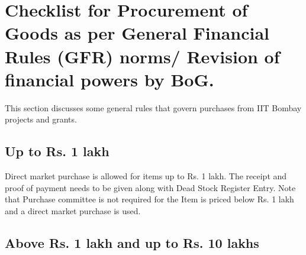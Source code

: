 \documentclass[
  10pt,
  a5paper,
  10pt,
  openany]{amsbook}
\begin{document}
\chapter{Checklist for Procurement of Goods as per General Financial
Rules (GFR) norms/ Revision of financial powers by
BoG.}\label{checklist-for-procurement-of-goods-as-per-general-financial-rules-gfr-norms-revision-of-financial-powers-by-bog.}

This section discusses some general rules that govern purchases from IIT
Bombay projects and grants.

\section{Up to Rs. 1 lakh}\label{up-to-rs.-1-lakh}

Direct market purchase is allowed for items up to Rs. 1 lakh. The
receipt and proof of payment needs to be given along with Dead Stock
Register Entry. Note that Purchase committee is not required for the
Item is priced below Rs. 1 lakh and a direct market purchase is used.

\section{Above Rs. 1 lakh and up to Rs. 10
lakhs}\label{above-rs.-1-lakh-and-up-to-rs.-10-lakhs}
\end{document}

